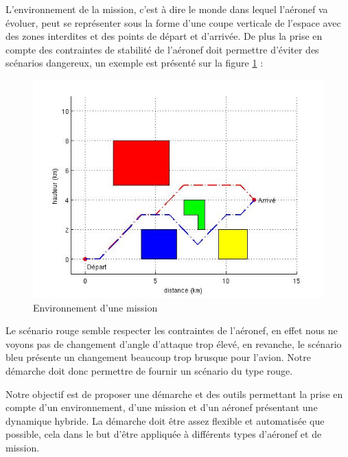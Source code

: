 L'environnement de la mission, c'est à dire le monde dans lequel l'aéronef va évoluer, peut se représenter sous la forme d'une coupe verticale de l'espace avec des zones interdites et des points de départ et d'arrivée. De plus la prise en compte des contraintes de stabilité de l'aéronef doit permettre d'éviter des scénarios dangereux, un exemple est présenté sur la figure \ref{fig:scenario} : 
\begin{figure}[!h]
	\centering	
	\includegraphics[scale=0.6]{images/scenario2.jpg}
	\caption{Environnement d'une mission}
	\label{fig:scenario}
\end{figure}

\pagebreak
Le scénario rouge semble respecter les contraintes de l'aéronef, en effet nous ne voyons pas de changement d'angle d'attaque trop élevé, en revanche, le scénario bleu présente un changement beaucoup trop brusque pour l'avion. Notre démarche doit donc permettre de fournir un scénario du type rouge.


Notre objectif est de proposer une démarche et des outils permettant la prise en compte d'un environnement, d'une mission et d'un aéronef présentant une dynamique hybride. La démarche doit être assez flexible et automatisée que possible, cela dans le but d'être appliquée à différents types d'aéronef et de mission.

